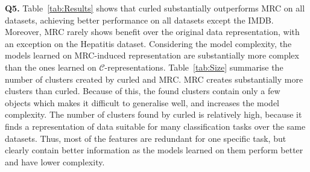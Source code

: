 \begin{table}
	\centering
\captionsetup{justification=centerlast}

	\caption[Model selection results with TILDE and \gls{curled}]{\textbf{Model selection results.} For each dataset, a selected parameters are reported together with the accuracies on the training and test sets. The first element indicates the selected clustering algorithm (S-spectral, H-hierarchical), the second one the clustering selection criteria, while the last one indicates the hyper-edge similarity (C-combination, M-merging). The last column indicates the performance on the original data representation. }
    \label{tab:MS}

\end{table}




\textbf{Q5.}
Table~\ref{tab:Results} shows that \gls{curled} substantially outperforms MRC on all datasets, achieving better performance on all datasets except the IMDB.
Moreover, MRC rarely shows benefit over the original data representation, with an exception on the Hepatitis dataset.
Considering the model complexity, the models learned on MRC-induced representation are substantially more complex than the ones learned on $\mathcal{C}$-representations.
Table~\ref{tab:Size} summarise the number of clusters created by \gls{curled} and MRC.
MRC creates substantially more clusters than \gls{curled}.
Because of this, the found clusters contain only a few objects which makes it difficult to generalise well, and increases the model complexity.
The number of clusters found by \gls{curled} is relatively high, because it finds a representation of data suitable for many classification tasks over the same datasets.
Thus, most of the features are redundant for one specific task, but clearly contain better information as the models learned on them perform better and have lower complexity.


